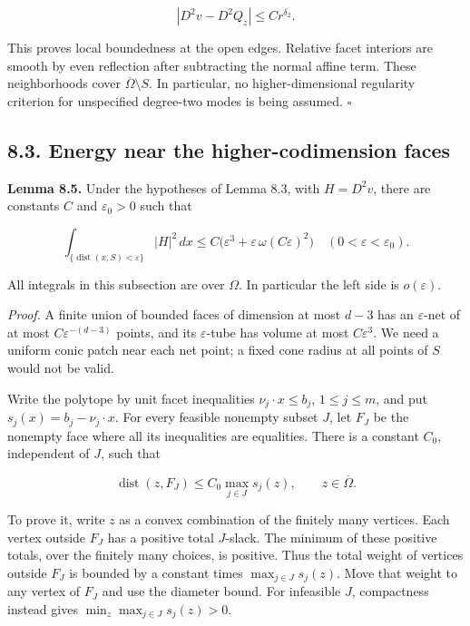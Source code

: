 \documentclass[11pt]{article}
\begin{document}
\[
|D^2v-D^2Q_z|\le Cr^{\delta_2}.
\tag{8.13}
\]

This proves local boundedness at the open edges. Relative facet
interiors are smooth by even reflection after subtracting the normal
affine term. These neighborhoods cover \(\overline\Omega\setminus S\).
In particular, no higher-dimensional regularity criterion for
unspecified degree-two modes is being assumed. \(\square\)

\subsection{8.3. Energy near the higher-codimension
faces}\label{energy-near-the-higher-codimension-faces}

\textbf{Lemma 8.5.} Under the hypotheses of Lemma 8.3, with \(H=D^2v\),
there are constants \(C\) and \(\varepsilon_0>0\) such that

\[
\int_{\{\operatorname{dist}(x,S)<\varepsilon\}}|H|^2\,dx
 \le C\bigl(\varepsilon^3+
       \varepsilon\,\omega(C\varepsilon)^2\bigr)
\quad(0<\varepsilon<\varepsilon_0).
\tag{8.14}
\]

All integrals in this subsection are over \(\Omega\). In particular the
left side is \(o(\varepsilon)\).

\emph{Proof.} A finite union of bounded faces of dimension at most
\(d-3\) has an \(\varepsilon\)-net of at most \(C\varepsilon^{-(d-3)}\)
points, and its \(\varepsilon\)-tube has volume at most
\(C\varepsilon^3\). We need a uniform conic patch near each net point; a
fixed cone radius at all points of \(S\) would not be valid.

Write the polytope by unit facet inequalities \(\nu_j\cdot x\le b_j\),
\(1\le j\le m\), and put \(s_j(x)=b_j-\nu_j\cdot x\). For every feasible
nonempty subset \(J\), let \(F_J\) be the nonempty face where all its
inequalities are equalities. There is a constant \(C_0\), independent of
\(J\), such that

\[
\operatorname{dist}(z,F_J)
 \le C_0\max_{j\in J}s_j(z),
\qquad z\in\overline\Omega.
\tag{8.15}
\]

To prove it, write \(z\) as a convex combination of the finitely many
vertices. Each vertex outside \(F_J\) has a positive total \(J\)-slack.
The minimum of these positive totals, over the finitely many choices, is
positive. Thus the total weight of vertices outside \(F_J\) is bounded
by a constant times \(\max_{j\in J}s_j(z)\). Move that weight to any
vertex of \(F_J\) and use the diameter bound. For infeasible \(J\),
compactness instead gives \(\min_z\max_{j\in J}s_j(z)>0\).
\end{document}
